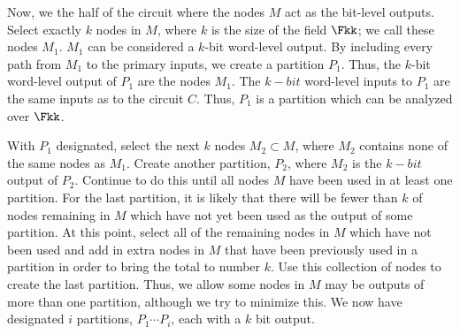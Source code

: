 Now, we the half of the circuit where the nodes $M$ act as the
bit-level outputs.
Select exactly $k$ nodes in $M$, where $k$ is the size of the field $\Fkk$; 
we call these nodes $M_1$. $M_1$ can be considered a $k$-bit word-level 
output. By including every path from $M_1$ to the primary inputs, we 
create a partition $P_1$. Thus, the $k$-bit word-level output of $P_1$ 
are the nodes $M_1$. The $k-bit$ word-level inputs to $P_1$ are the same 
inputs as to the circuit $C$. Thus, $P_1$ is a partition which can be 
analyzed over $\Fkk$.

With $P_1$ designated, select the next $k$ nodes $M_2\subset M$, where $M_2$
contains none of the same nodes as $M_1$. 
Create another partition, $P_2$, where $M_2$ is the $k-bit$ output of $P_2$.
Continue to do this 
until all nodes $M$ have been used in at least one partition.
For the last partition, it is likely that there will be fewer
than $k$ of nodes remaining in $M$ which have not yet been used as the 
output of some partition. 
At this point, select all of the remaining nodes in $M$ which have not been
used
and add in extra nodes in $M$ that have been previously used in a 
partition in order to bring the total to number $k$. Use this collection
of nodes to create the last partition.
Thus, we allow some nodes in $M$ may be outputs of more than one partition, 
although we try to minimize this.
We now have designated $i$ partitions, $P_1 \cdots P_i$, each with a $k$ 
bit output.

